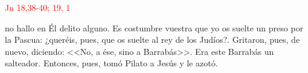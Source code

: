 \hfill\textcolor{red}{Jn 18,38-40; 19, 1}

no hallo en Él delito alguno. Es costumbre vuestra que yo os suelte un preso por la Pascua: ¿queréis, 
pues, que os suelte al rey de los Judíos?\guillemotright. Gritaron, pues, de nuevo, diciendo: <<No, a ése, sino a Barrabás>>. 
Era este Barrabás un salteador. Entonces, pues, tomó Pilato a Jesús y le azotó. 